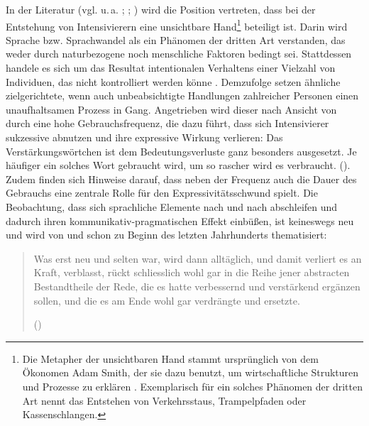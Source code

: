 In der Literatur (vgl. u.\,a. \citealt[]{Keller.1990, Keller.1994}; \citealt[]{Kirschbaum.2002b}; \citealt[]{Keller.2003}) wird die Position vertreten, dass bei der Entstehung von Intensivierern eine unsichtbare Hand\footnote{Die Metapher der \glqq{}unsichtbaren Hand\grqq{} stammt ursprünglich von dem Ökonomen Adam Smith, der sie dazu benutzt, um wirtschaftliche Strukturen und Prozesse zu erklären \citep[vgl.][92]{Keller.1990}. Exemplarisch für ein solches \glqq{}Phänomen der dritten Art\grqq{} nennt {\citet[97]{Keller.1990}} das Entstehen von Verkehrsstaus, Trampelpfaden oder Kassenschlangen.} beteiligt ist. Darin wird Sprache bzw. Sprachwandel als ein \glqq{}Phänomen der dritten Art\grqq{} verstanden, das weder durch naturbezogene noch menschliche Faktoren bedingt sei. Stattdessen handele es sich um das Resultat intentionalen Verhaltens einer Vielzahl von Individuen, das nicht kontrolliert werden könne {\citep[vgl.][92]{Keller.1994}}. Demzufolge setzen ähnliche zielgerichtete, wenn auch unbeabsichtigte Handlungen zahlreicher Personen einen unaufhaltsamen Prozess in Gang. Angetrieben wird dieser nach Ansicht von \citet[]{Hauschild.1899} durch eine hohe Gebrauchsfrequenz, die dazu führt, dass sich Intensivierer sukzessive abnutzen und ihre expressive Wirkung verlieren: \glqq{}Das Verstärkungswörtchen \textelp{} ist dem Bedeutungsverluste ganz besonders ausgesetzt. Je häufiger ein solches Wort gebraucht wird, um so rascher wird es verbraucht.\grqq{} {(\citealt[2]{Hauschild.1899}}). Zudem finden sich Hinweise darauf, dass neben der Frequenz auch die Dauer des Gebrauchs eine zentrale Rolle für den Expressivitätsschwund spielt. Die Beobachtung, dass sich sprachliche Elemente nach und nach abschleifen und dadurch ihren kommunikativ-pragmatischen Effekt einbüßen, ist keineswegs neu und wird von {\citet[59]{Tobler.1868}} und {\citet[253]{Gabelentz.2016}} schon zu Beginn des letzten Jahrhunderts thematisiert:

\begin{quotation} \noindent Was erst neu und selten war, wird dann alltäglich, und damit verliert es an Kraft, verblasst, rückt schliesslich wohl gar in die Reihe jener abstracten Bestandtheile der Rede, die es hatte verbessernd und verstärkend ergänzen sollen, und die es am Ende wohl gar verdrängte und ersetzte.

 \hfill (\citealt[253]{Gabelentz.2016})  \end{quotation}
 

